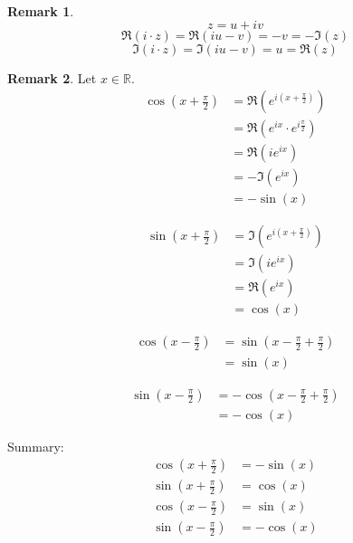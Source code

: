 \documentclass[a4paper,landscape,twocolumn]{article}
\theoremstyle{definition}
\newtheorem{rem}{Remark}
\begin{document}
\begin{rem}
  \[ z = u + iv \]
  \[ \Re(i \cdot z) = \Re(i u - v) = -v = - \Im(z) \]
  \[ \Im(i \cdot z) = \Im(iu - v) = u = \Re(z) \]
\end{rem}

\begin{rem}
  Let $x \in \mathbb R$.
  \begin{align*}
    \cos\left(x + \frac\pi2\right)
      &= \Re(e^{i(x + \frac\pi2)}) \\
      &= \Re(e^{ix} \cdot e^{i\frac\pi2}) \\
      &= \Re(i e^{ix}) \\
      &= -\Im(e^{ix}) \\
      &= -\sin(x)
  \end{align*}

  \begin{align*}
    \sin\left(x + \frac\pi2\right)
      &= \Im\left(e^{i(x + \frac\pi2)}\right) \\
      &= \Im(ie^{ix}) \\
      &= \Re(e^{ix}) \\
      &= \cos(x)
  \end{align*}

  \begin{align*}
    \cos\left(x - \frac\pi2\right)
      &= \sin\left(x - \frac\pi2 + \frac\pi2\right) \\
      &= \sin(x)
  \end{align*}

  \begin{align*}
    \sin\left(x - \frac\pi2\right)
      &= -\cos\left(x - \frac\pi2 + \frac\pi2\right) \\
      &= -\cos(x)
  \end{align*}

  Summary:
  \begin{align*}
    \cos\left(x + \frac\pi2\right) &= -\sin(x) \\
    \sin\left(x + \frac\pi2\right) &= \cos(x) \\
    \cos\left(x - \frac\pi2\right) &= \sin(x) \\
    \sin\left(x - \frac\pi2\right) &= -\cos(x)
  \end{align*}
\end{rem}
\end{document}
